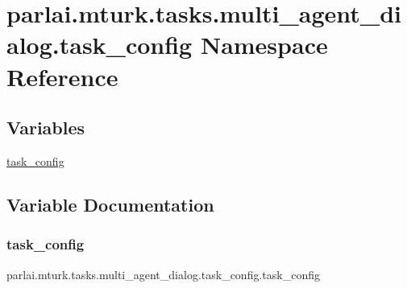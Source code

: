 \hypertarget{namespaceparlai_1_1mturk_1_1tasks_1_1multi__agent__dialog_1_1task__config}{}\section{parlai.\+mturk.\+tasks.\+multi\+\_\+agent\+\_\+dialog.\+task\+\_\+config Namespace Reference}
\label{namespaceparlai_1_1mturk_1_1tasks_1_1multi__agent__dialog_1_1task__config}
\subsection*{Variables}
\begin{DoxyCompactItemize}
\item 
\hyperlink{namespaceparlai_1_1mturk_1_1tasks_1_1multi__agent__dialog_1_1task__config_a3629b862f3e08d3533ac195c2c626bf1}{task\+\_\+config}
\end{DoxyCompactItemize}


\subsection{Variable Documentation}
\mbox{\label{namespaceparlai_1_1mturk_1_1tasks_1_1multi__agent__dialog_1_1task__config_a3629b862f3e08d3533ac195c2c626bf1}} 
\subsubsection{\texorpdfstring{task\+\_\+config}{task\_config}}
{\footnotesize\ttfamily parlai.\+mturk.\+tasks.\+multi\+\_\+agent\+\_\+dialog.\+task\+\_\+config.\+task\+\_\+config}

